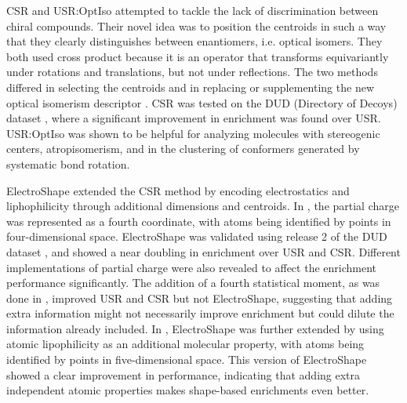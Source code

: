 CSR \citep{1334} and USR:OptIso \citep{1335} attempted to tackle the lack of discrimination between chiral compounds. Their novel idea was to position the centroids in such a way that they clearly distinguishes between enantiomers, i.e. optical isomers. They both used cross product because it is an operator that transforms equivariantly under rotations and translations, but not under reflections. The two methods differed in selecting the centroids and in replacing or supplementing the new optical isomerism descriptor \citep{1335}. CSR \citep{1334} was tested on the DUD (Directory of Decoys) dataset \citep{87}, where a significant improvement in enrichment was found over USR. USR:OptIso \citep{1335} was shown to be helpful for analyzing molecules with stereogenic centers, atropisomerism, and in the clustering of conformers generated by systematic bond rotation.

ElectroShape \citep{1337,1338} extended the CSR \citep{1334} method by encoding electrostatics and liphophilicity through additional dimensions and centroids. In \citep{1337}, the partial charge was represented as a fourth coordinate, with atoms being identified by points in four-dimensional space. ElectroShape was validated using release 2 of the DUD dataset \citep{87}, and showed a near doubling in enrichment over USR and CSR. Different implementations of partial charge were also revealed to affect the enrichment performance significantly. The addition of a fourth statistical moment, as was done in \citep{1333}, improved USR and CSR but not ElectroShape, suggesting that adding extra information might not necessarily improve enrichment but could dilute the information already included. In \citep{1338}, ElectroShape was further extended by using atomic lipophilicity as an additional molecular property, with atoms being identified by points in five-dimensional space. This version of ElectroShape showed a clear improvement in performance, indicating that adding extra independent atomic properties makes shape-based enrichments even better.

